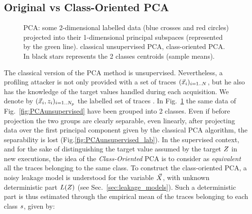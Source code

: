 \subsection{Original vs Class-Oriented PCA}
\begin{figure}[t]
\caption{PCA: some 2-dimensional labelled data (blue crosses and red circles) projected into their 1-dimensional principal subspaces (represented by the green line).  classical unsupervised PCA,  class-oriented PCA. In  black stars represents the 2 classes centroids (sample means).}\label{fig:2class-toys}
\end{figure}
The classical version of the PCA method is unsupervised.
Nevertheless, a profiling attacker is not only provided with a set of traces $(\vec{x}_i)_{i=1..N}$, but he also has the knowledge of the target values handled during each acquisition. We denote by $(\vec{x}_i, z_i)_{i=1..N_p}$ the labelled set of traces . In Fig.~\ref{fig:2class-toys} the same data of Fig.~\ref{fig:PCAunsupervised} have been grouped into 2 classes. Even if before projection the two groups are clearly separable, even linearly, after projecting data over the first principal component given by the classical PCA algorithm, the separability is lost (Fig.\ref{fig:PCAunsupervised_lab}). In the supervised context, and for the sake of distinguishing the target value assumed by the target $Z$ in new executions, the idea of the {\em Class-Oriented} PCA is to consider as {\em equivalent} all the traces belonging to the same class. To construct the class-oriented PCA, a noisy leakage model is understood for the variable $\vec{X}$, with unknown deterministic part $L(Z)$ (see Sec.~\ref{sec:leakage_models}). Such a deterministic part is thus estimated through the empirical mean of the traces belonging to each class $s$, given by:
